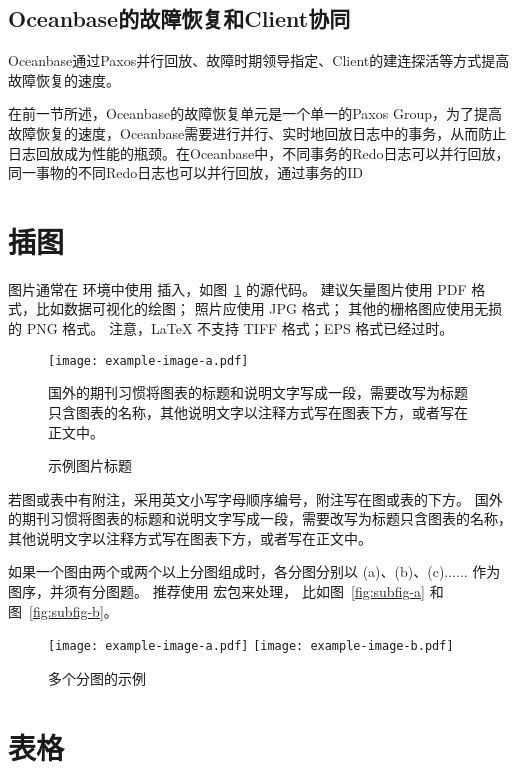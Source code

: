\subsection{Oceanbase的故障恢复和Client协同}

Oceanbase通过Paxos并行回放、故障时期领导指定、Client的建连探活等方式提高故障恢复的速度。

在前一节所述，Oceanbase的故障恢复单元是一个单一的Paxos Group，为了提高故障恢复的速度，Oceanbase需要进行并行、实时地回放日志中的事务，从而防止日志回放成为性能的瓶颈。在Oceanbase中，不同事务的Redo日志可以并行回放，同一事物的不同Redo日志也可以并行回放，通过事务的ID


\section{插图}

图片通常在  环境中使用  插入，如图~\ref{fig:example} 的源代码。
建议矢量图片使用 PDF 格式，比如数据可视化的绘图；
照片应使用 JPG 格式；
其他的栅格图应使用无损的 PNG 格式。
注意，LaTeX 不支持 TIFF 格式；EPS 格式已经过时。

\begin{figure}
  \centering
  \texttt{[image: example-image-a.pdf]}
  \caption*{国外的期刊习惯将图表的标题和说明文字写成一段，需要改写为标题只含图表的名称，其他说明文字以注释方式写在图表下方，或者写在正文中。}
  \caption{示例图片标题}
  \label{fig:example}
\end{figure}

若图或表中有附注，采用英文小写字母顺序编号，附注写在图或表的下方。
国外的期刊习惯将图表的标题和说明文字写成一段，需要改写为标题只含图表的名称，其他说明文字以注释方式写在图表下方，或者写在正文中。

如果一个图由两个或两个以上分图组成时，各分图分别以 (a)、(b)、(c)...... 作为图序，并须有分图题。
推荐使用  宏包来处理， 比如图~\ref{fig:subfig-a} 和图~\ref{fig:subfig-b}。

\begin{figure}
  \centering
    {\texttt{[image: example-image-a.pdf]}}
    {\texttt{[image: example-image-b.pdf]}}
  \caption{多个分图的示例}
  \label{fig:multi-image}
\end{figure}



\section{表格}

